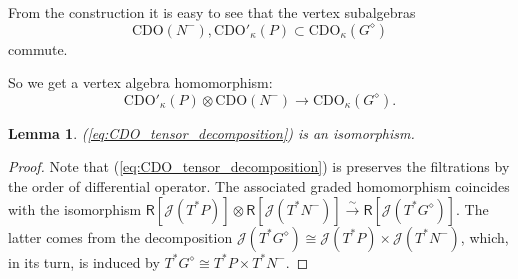 \documentclass{amsart}
\newtheorem{Lem}[Thm]{Lemma}
\theoremstyle{definition}
\newcommand{\Ring}{\mathsf{R}}
\newcommand{\g}{\mathfrak{g}}
\newcommand{\Jet}{\mathscr{J}}
\newcommand{\frp}{\mathfrak{p}}
\newcommand{\CDO}{\mathrm{CDO}}
\numberwithin{equation}{section}
\begin{document}
From the construction it is easy to see that 
the vertex subalgebras 
$$\CDO(N^-),\CDO'_{\kappa}(P)\subset \CDO_\kappa(G^\diamond)$$ commute.


So we get a vertex algebra homomorphism:
\begin{equation}\label{eq:CDO_tensor_decomposition}
\CDO'_{\kappa}(P)\otimes \CDO(N^-) \to \CDO_\kappa(G^\diamond).
\end{equation}

\begin{Lem}\label{Lem:CDO_tensor_decomposition}
(\ref{eq:CDO_tensor_decomposition}) is an isomorphism.
\end{Lem}
\begin{proof}
Note that (\ref{eq:CDO_tensor_decomposition}) is preserves the filtrations by the order of differential operator. The associated graded homomorphism 
coincides with the isomorphism 
$\Ring[\Jet(T^*P)]\otimes \Ring[\Jet(T^*N^-)]\xrightarrow{\sim} \Ring[\Jet(T^*G^\diamond)]$. The latter comes from the decomposition $\Jet(T^*G^\diamond)\cong \Jet(T^*P)\times \Jet(T^*N^-)$, which, in its turn, is induced by $T^*G^\diamond\cong T^*P\times T^*N^-$.
%
%
\end{proof}
\end{document}
